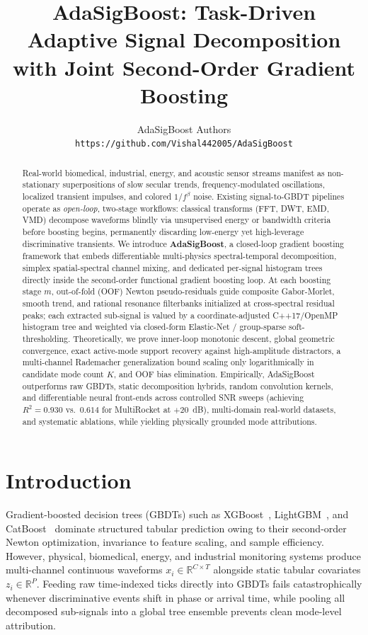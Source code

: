 \documentclass[10pt]{article}
\title{\textbf{AdaSigBoost: Task-Driven Adaptive Signal Decomposition with Joint Second-Order Gradient Boosting}}
\author{
  AdaSigBoost Authors \\
  \texttt{https://github.com/Vishal442005/AdaSigBoost}
}
\date{}
\newcommand{\R}{\mathbb{R}}
\begin{document}
\maketitle

\begin{abstract}
Real-world biomedical, industrial, energy, and acoustic sensor streams manifest as non-stationary superpositions of slow secular trends, frequency-modulated oscillations, localized transient impulses, and colored $1/f^\beta$ noise. Existing signal-to-GBDT pipelines operate as \emph{open-loop}, two-stage workflows: classical transforms (FFT, DWT, EMD, VMD) decompose waveforms blindly via unsupervised energy or bandwidth criteria before boosting begins, permanently discarding low-energy yet high-leverage discriminative transients. We introduce \textbf{AdaSigBoost}, a closed-loop gradient boosting framework that embeds differentiable multi-physics spectral-temporal decomposition, simplex spatial-spectral channel mixing, and dedicated per-signal histogram trees directly inside the second-order functional gradient boosting loop. At each boosting stage $m$, out-of-fold (OOF) Newton pseudo-residuals guide composite Gabor-Morlet, smooth trend, and rational resonance filterbanks initialized at cross-spectral residual peaks; each extracted sub-signal is valued by a coordinate-adjusted C++17/OpenMP histogram tree and weighted via closed-form Elastic-Net / group-sparse soft-thresholding. Theoretically, we prove inner-loop monotonic descent, global geometric convergence, exact active-mode support recovery against high-amplitude distractors, a multi-channel Rademacher generalization bound scaling only logarithmically in candidate mode count $K$, and OOF bias elimination. Empirically, AdaSigBoost outperforms raw GBDTs, static decomposition hybrids, random convolution kernels, and differentiable neural front-ends across controlled SNR sweeps (achieving $R^2 = 0.930$ vs.\ $0.614$ for MultiRocket at $+20$~dB), multi-domain real-world datasets, and systematic ablations, while yielding physically grounded mode attributions.
\end{abstract}

\section{Introduction}
\label{sec:intro}
Gradient-boosted decision trees (GBDTs) such as XGBoost~\citep{chen2016xgboost}, LightGBM~\citep{ke2017lightgbm}, and CatBoost~\citep{prokhorenkova2018catboost} dominate structured tabular prediction owing to their second-order Newton optimization, invariance to feature scaling, and sample efficiency. However, physical, biomedical, energy, and industrial monitoring systems produce multi-channel continuous waveforms $x_i \in \R^{C \times T}$ alongside static tabular covariates $z_i \in \R^P$. Feeding raw time-indexed ticks directly into GBDTs fails catastrophically whenever discriminative events shift in phase or arrival time, while pooling all decomposed sub-signals into a global tree ensemble prevents clean mode-level attribution.
\end{document}
